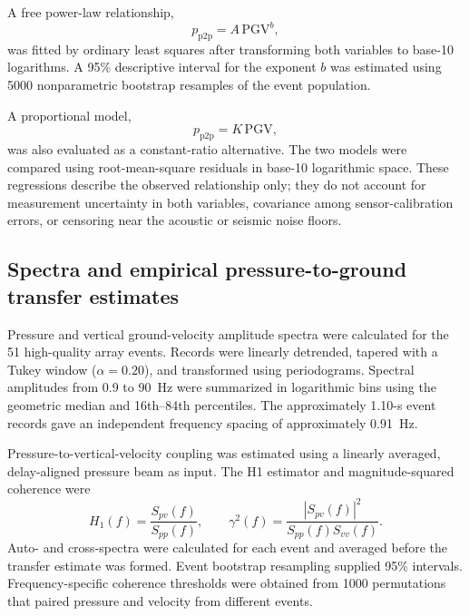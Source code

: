 \documentclass[]{seismica}
\begin{document}
A free power-law relationship,
\begin{equation}
  p_{\mathrm{p2p}} = A\,\mathrm{PGV}^{b},
  \label{eq:power_law}
\end{equation}
was fitted by ordinary least squares after transforming both variables to base-10 logarithms. A 95\% descriptive interval for the exponent $b$ was estimated using 5000 nonparametric bootstrap resamples of the event population.

A proportional model,
\begin{equation}
  p_{\mathrm{p2p}} = K\,\mathrm{PGV},
  \label{eq:proportional_model}
\end{equation}
was also evaluated as a constant-ratio alternative. The two models were compared using root-mean-square residuals in base-10 logarithmic space. These regressions describe the observed relationship only; they do not account for measurement uncertainty in both variables, covariance among sensor-calibration errors, or censoring near the acoustic or seismic noise floors.

\subsection{Spectra and empirical pressure-to-ground transfer estimates}

Pressure and vertical ground-velocity amplitude spectra were calculated for the
51 high-quality array events. Records were linearly detrended, tapered with a
Tukey window ($\alpha=0.20$), and transformed using periodograms. Spectral
amplitudes from 0.9 to 90~Hz were summarized in logarithmic bins using the
geometric median and 16th--84th percentiles. The approximately 1.10-s event
records gave an independent frequency spacing of approximately 0.91~Hz.

Pressure-to-vertical-velocity coupling was estimated using a linearly averaged,
delay-aligned pressure beam as input. The H1 estimator and magnitude-squared
coherence were
\begin{equation}
  H_1(f)=\frac{S_{pv}(f)}{S_{pp}(f)}, \qquad
  \gamma^2(f)=\frac{|S_{pv}(f)|^2}{S_{pp}(f)S_{vv}(f)}.
  \label{eq:h1_transfer}
\end{equation}
Auto- and cross-spectra were calculated for each event and averaged before the
transfer estimate was formed. Event bootstrap resampling supplied 95\%
intervals. Frequency-specific coherence thresholds were obtained from 1000
permutations that paired pressure and velocity from different events.
\end{document}
